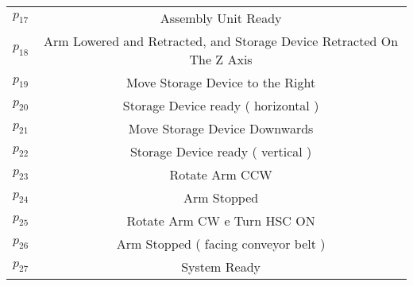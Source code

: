 \begin{table}[htbp]
\begin{tabular}{c|c}
\hyperlink{partialNet:p17}{\hypertarget{partialTable:p17}{$p_{17}$}} & Assembly Unit Ready\\
\hyperlink{partialNet:p18}{\hypertarget{partialTable:p18}{$p_{18}$}} & Arm Lowered and Retracted, and Storage Device Retracted On The Z Axis\\
\hyperlink{partialNet:p19}{\hypertarget{partialTable:p19}{$p_{19}$}} & Move Storage Device to the Right\\
\hyperlink{partialNet:p20}{\hypertarget{partialTable:p20}{$p_{20}$}} & Storage Device ready ( horizontal )\\
\hyperlink{partialNet:p21}{\hypertarget{partialTable:p21}{$p_{21}$}} & Move Storage Device Downwards\\
\hyperlink{partialNet:p22}{\hypertarget{partialTable:p22}{$p_{22}$}} & Storage Device ready ( vertical )\\
\hyperlink{partialNet:p23}{\hypertarget{partialTable:p23}{$p_{23}$}} & Rotate Arm CCW\\
\hyperlink{partialNet:p24}{\hypertarget{partialTable:p24}{$p_{24}$}} & Arm Stopped\\
\hyperlink{partialNet:p25}{\hypertarget{partialTable:p25}{$p_{25}$}} & Rotate Arm CW e Turn HSC ON\\
\hyperlink{partialNet:p26}{\hypertarget{partialTable:p26}{$p_{26}$}} & Arm Stopped ( facing conveyor belt )\\
\hyperlink{partialNet:p27}{\hypertarget{partialTable:p27}{$p_{27}$}} & System Ready\\
\end{tabular}
\end{table}

